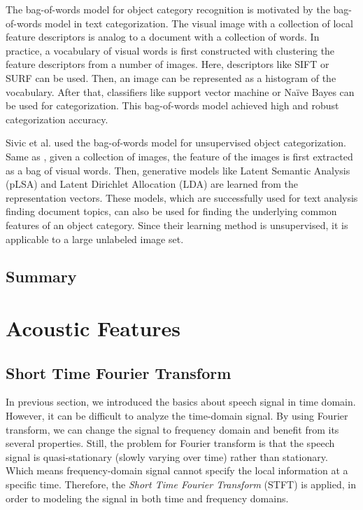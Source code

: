 \documentclass[12pt,final,twoside]{report}
\theoremstyle{plain}
\theoremstyle{definition}
\theoremstyle{remark}
\begin{document}
The bag-of-words model \cite{csurka_visual_2004} for object category recognition is motivated by the bag-of-words model in text categorization. The visual image with a collection of local feature descriptors is analog to a document with a collection of words. In practice, a vocabulary of visual words is first constructed with clustering the feature descriptors from a number of images. Here, descriptors like SIFT or SURF can be used. Then, an image can be represented as a histogram of the vocabulary. After that, classifiers like support vector machine or Na\"ive Bayes can be used for categorization. This bag-of-words model achieved high and robust categorization accuracy.

Sivic et al. \cite{sivic_discovering_2005} used the bag-of-words model for unsupervised object categorization. Same as \cite{csurka_visual_2004}, given a collection of images, the feature of the images is first extracted as a bag of visual words. Then, generative models like Latent Semantic Analysis (pLSA) and Latent Dirichlet Allocation (LDA) are learned from the representation vectors. These models, which are successfully used for text analysis finding document topics, can also be used for finding the underlying common features of an object category. Since their learning method is unsupervised, it is applicable to a large unlabeled image set.

\section{Summary}


\cleardoublepage
\chapter{Acoustic Features}

\section{Short Time Fourier Transform}
In previous section, we introduced the basics about speech signal in time domain. However, it can be difficult to analyze the time-domain signal. By using Fourier transform, we can change the signal to frequency domain and benefit from its several properties. Still, the problem for Fourier transform is that the speech signal is quasi-stationary (slowly varying over time) rather than stationary. Which means frequency-domain signal cannot specify the local information at a specific time. Therefore, the \textit{Short Time Fourier Transform} (STFT) is applied, in order to modeling the signal in both time and frequency domains.
\end{document}
